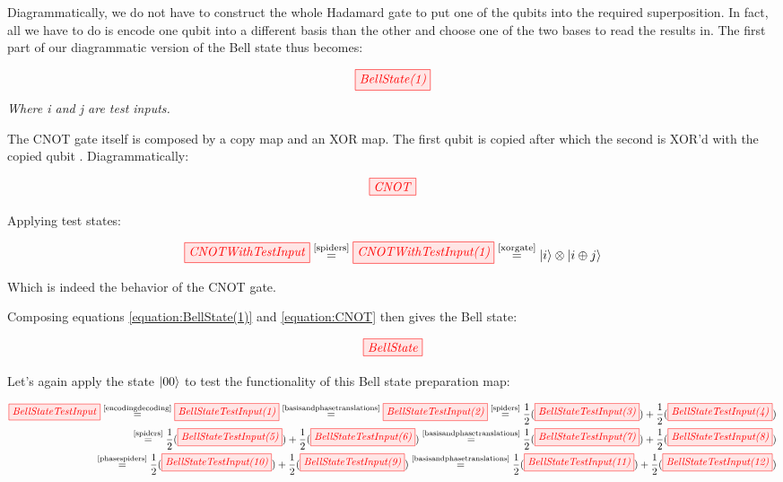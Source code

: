 \documentclass[]{article}
\newcommand{\equaltext}[1]{\ensuremath{\stackrel{\text{#1}}{=}}}
\begin{document}
Diagrammatically, we do not have to construct the whole Hadamard gate to put one of the qubits into the required superposition. In fact, all we have to do is encode one qubit into a different basis than the other and choose one of the two bases to read the results in. The first part of our diagrammatic version of the Bell state thus becomes:

\begin{equation}
	\label{equation:BellState(1)}
	\tikzfig{BellState(1)}
\end{equation}
\textit{Where i and j are test inputs.}

The CNOT gate itself is composed by a copy map and an XOR map. The first qubit is copied after which the second is XOR'd with the copied qubit \cite{articleCNOT}. Diagrammatically:

\begin{equation}
	\label{equation:CNOT}
	\tikzfig{CNOT}
\end{equation}

Applying test states:

\begin{equation}
	\tikzfig{CNOTWithTestInput} \equaltext{\ref{spiders}} \tikzfig{CNOTWithTestInput(1)} \equaltext{\ref{xorgate}} \ket{i} \otimes \ket{i \oplus j}
\end{equation}

Which is indeed the behavior of the CNOT gate.

Composing equations \ref{equation:BellState(1)} and \ref{equation:CNOT} then gives the Bell state:

\begin{equation}
	\tikzfig{BellState}
\end{equation}

Let's again apply the state $\ket{00}$ to test the functionality of this Bell state preparation map:

\begin{equation}
\label{BellStateTestInput}
	\begin{split}
	\tikzfig{BellStateTestInput} \equaltext{\ref{encodingdecoding}} \tikzfig{BellStateTestInput(1)} \equaltext{\ref{basisandphasetranslations}} \tikzfig{BellStateTestInput(2)} \equaltext{\ref{spiders}} \frac{1}{2}(\tikzfig{BellStateTestInput(3)}) + \frac{1}{2}(\tikzfig{BellStateTestInput(4)}) \\ \equaltext{\ref{spiders}} \frac{1}{2}(\tikzfig{BellStateTestInput(5)}) +
	\frac{1}{2}(\tikzfig{BellStateTestInput(6)}) 
	\equaltext{\ref{basisandphasetranslations}} \frac{1}{2}(\tikzfig{BellStateTestInput(7)}) + \frac{1}{2}(\tikzfig{BellStateTestInput(8)}) \\ \equaltext{\ref{phasespiders}}
	\frac{1}{2}(\tikzfig{BellStateTestInput(10)}) +
	 \frac{1}{2}(\tikzfig{BellStateTestInput(9)}) 
	 \equaltext{\ref{basisandphasetranslations}} \frac{1}{2}(\tikzfig{BellStateTestInput(11)}) +
	\frac{1}{2}(\tikzfig{BellStateTestInput(12)})
	\end{split}
\end{equation}
\end{document}
